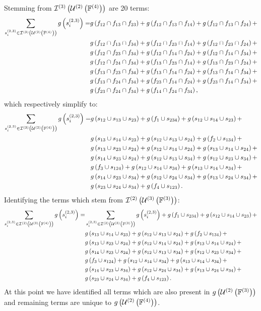 \documentclass[11pt]{article}
\newcommand{\gxn}[1]{g\left(#1\right)}
\newcommand{\smem}[2]{s^{\left(#1\right)}_{#2}}
\newcommand{\gapprox}[1]{g\left(#1\right)}
\begin{document}
Stemming from $\mathcal{I}^{(3)}\left(\mathcal{U}^{(2)}\left(\mathbb{F}^{(4)}\right)\right)$ are 20 terms:
\begin{align}
	\sum_{\smem{2,3}{i}\in\intsset{3}{2}{4}}\gxn{\smem{2,3}{i}} =
	  & \gxn{\IDiDjDk} + \gxn{\IDiDjDl} + \gxn{\IDiDjDm} + \nonumber\\
	  & \gxn{\IDiDjDn} + \gxn{\IDiDkDl} + \gxn{\IDiDkDm} + \nonumber\\
	  & \gxn{\IDiDkDn} + \gxn{\IDiDlDm} + \gxn{\IDiDlDn} + \nonumber\\
	  & \gxn{\IDiDmDn} + \gxn{\IDjDkDl} + \gxn{\IDjDkDm} + \nonumber\\
	  & \gxn{\IDjDkDn} + \gxn{\IDjDlDm} + \gxn{\IDjDlDn} + \nonumber\\
	  & \gxn{\IDjDmDn} + \gxn{\IDkDlDm} + \gxn{\IDkDlDn} + \nonumber\\
	  & \gxn{\IDkDmDn} + \gxn{\IDlDmDn},
\end{align}
which respectively simplify to:
\begin{align}
	\sum_{\smem{2,3}{i}\in\intsset{3}{2}{4}}\gxn{\smem{2,3}{i}} =
	& \gxn{\Ii\cup\Ij\cup\Ik} + \gxn{f_1\cup\Ill} +
	  \gxn{\Ii\cup\Il\cup\Ik} + \nonumber\\
	& \gxn{\Ij\cup\Il\cup\Ik} + \gxn{\Ii\cup\Ij\cup\In} +
	  \gxn{f_2\cup\Ikk} + \nonumber\\
	& \gxn{\Ij\cup\Ik\cup\In} + \gxn{\Ii\cup\Il\cup\In} +
	  \gxn{\Ij\cup\Il\cup\In} + \nonumber\\
	& \gxn{\Il\cup\Ik\cup\In} + \gxn{\Ii\cup\Ij\cup\Io} +
	  \gxn{\Ii\cup\Ik\cup\Io} + \nonumber\\
	& \gxn{f_3\cup\Ijj} + \gxn{\Ii\cup\Il\cup\Io} +
	  \gxn{\Ij\cup\Il\cup\Io} + \nonumber\\
	& \gxn{\Il\cup\Ik\cup\Io} + \gxn{\Ii\cup\In\cup\Io} +
	  \gxn{\Ij\cup\In\cup\Io} +\nonumber\\
	& \gxn{\Ik\cup\In\cup\Io} + \gxn{f_4\cup\Iii}.
\end{align}
Identifying the terms which stem from $\mathcal{I}^{(2)}\left(\mathcal{U}^{(3)}\left(\mathbb{F}^{(3)}\right)\right)$:
\begin{align}
	\sum_{\smem{2,3}{i}\in\intsset{2}{3}{4}}\gxn{\smem{2,3}{i}} =
	& \sum_{\smem{2,3}{i}\in\intsset{2}{3}{3}}\gxn{\smem{2,3}{i}} +
	  \gxn{f_1\cup\Ill} + \gxn{\Ii\cup\Il\cup\Ik} + \nonumber\\
	& \gxn{\Ij\cup\Il\cup\Ik} + \gxn{\Ii\cup\Ij\cup\In} +
	\gxn{f_2\cup\Ikk} + \nonumber\\
	& \gxn{\Ij\cup\Ik\cup\In} + \gxn{\Ii\cup\Il\cup\In} +
	\gxn{\Ij\cup\Il\cup\In} + \nonumber\\
	& \gxn{\Il\cup\Ik\cup\In} + \gxn{\Ii\cup\Ij\cup\Io} +
	\gxn{\Ii\cup\Ik\cup\Io} + \nonumber\\
	& \gxn{f_3\cup\Ijj} + \gxn{\Ii\cup\Il\cup\Io} +
	\gxn{\Ij\cup\Il\cup\Io} + \nonumber\\
	& \gxn{\Il\cup\Ik\cup\Io} + \gxn{\Ii\cup\In\cup\Io} +
	\gxn{\Ij\cup\In\cup\Io} +\nonumber\\
	& \gxn{\Ik\cup\In\cup\Io} + \gxn{f_4\cup\Iii}.
\end{align}
At this point we have identified all terms which are also present in
$\gapprox{\unionset{2}{3}}$ and remaining terms are unique to
$\gapprox{\unionset{2}{4}}$.
\end{document}
